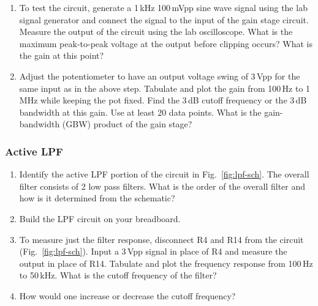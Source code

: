\documentclass[letterpaper, 11pt]{article}
\begin{document}
\begin{enumerate}
	\item To test the circuit, generate a 1\,kHz 100\,mVpp sine wave signal using the lab signal generator and connect the signal to the input of the gain stage circuit. Measure the output of the circuit using the lab oscilloscope. What is the maximum peak-to-peak voltage at the output before clipping occurs? What is the gain at this point?
	
	\item Adjust the potentiometer to have an output voltage swing of 3\,Vpp for the same input as in the above step. 
	Tabulate and plot the gain from 100\,Hz to 1\,MHz while keeping the pot fixed. Find the 3\,dB cutoff frequency or the 3\,dB bandwidth at this gain. Use at least 20 data points. What is the gain-bandwidth (GBW) product of the gain stage? 
	

\end{enumerate}

\subsubsection{Active LPF}
\begin{enumerate}
	\item Identify the active LPF portion of the circuit in Fig.~\ref{fig:lpf-sch}. The overall filter consists of 2 low pass filters. What is the order of the overall filter and how is it determined from the schematic?
	
	\item Build the LPF circuit on your breadboard. 
	
	\item To measure just the filter response, disconnect R4 and R14 from the circuit (Fig.~\ref{fig:lpf-sch}). Input a 3\,Vpp signal in place of R4 and measure the output in place of R14. Tabulate and plot the frequency response from 100\,Hz to 50\,kHz. What is the cutoff frequency of the filter?
	
	\item How would one increase or decrease the cutoff frequency?
	
\end{enumerate}

\end{document}
